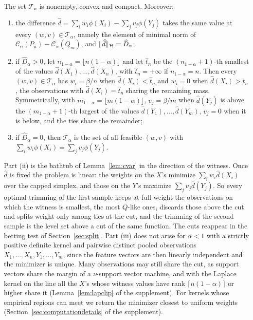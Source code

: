 \begin{proposition}
\label{prop:bangbang}
The set $\mathcal T_\alpha$ is nonempty, convex and compact. Moreover:
\begin{enumerate}[label=(\roman*),leftmargin=*]
\item the difference $\widehat d=\sum_iw_i\phi(X_i)-\sum_jv_j\phi(Y_j)$ takes the same value at every
$(w,v)\in\mathcal T_\alpha$, namely the element of minimal norm of $\mathcal C_\alpha(P_n)-\mathcal C_\alpha(Q_m)$, and
$\|\widehat d\|_{\mathcal{H}}=\widehat D_\alpha$;
\item if $\widehat D_\alpha>0$, let $n_{1-\alpha}=\lfloor n(1-\alpha)\rfloor$ and let $\widehat t_n$ be the
$(n_{1-\alpha}+1)$-th smallest of the values $\widehat d(X_1),\dots,\widehat d(X_n)$, with $\widehat t_n=+\infty$ if
$n_{1-\alpha}=n$. Then every $(w,v)\in\mathcal T_\alpha$ has $w_i=\beta/n$ when $\widehat d(X_i)<\widehat t_n$ and $w_i=0$
when $\widehat d(X_i)>\widehat t_n$, the observations with $\widehat d(X_i)=\widehat t_n$ sharing the remaining mass.
Symmetrically, with $m_{1-\alpha}=\lfloor m(1-\alpha)\rfloor$, $v_j=\beta/m$ when $\widehat d(Y_j)$ is above the
$(m_{1-\alpha}+1)$-th largest of the values $\widehat d(Y_1),\dots,\widehat d(Y_m)$, $v_j=0$ when it is below, and the ties
share the remainder;
\item if $\widehat D_\alpha=0$, then $\mathcal T_\alpha$ is the set of all feasible $(w,v)$ with
$\sum_iw_i\phi(X_i)=\sum_jv_j\phi(Y_j)$.
\end{enumerate}
\end{proposition}

Part (ii) is the bathtub of Lemma~\ref{lem:cvar} in the direction of the witness. Once $\widehat d$ is fixed the
problem is linear: the weights on the $X$'s minimize $\sum_iw_i\widehat d(X_i)$ over the capped simplex, and those on
the $Y$'s maximize $\sum_jv_j\widehat d(Y_j)$. So every optimal trimming of the first sample keeps at full weight the
observations on which the witness is smallest, the most $Q$-like ones, discards those above the cut and splits weight
only among ties at the cut, and the trimming of the second sample is the level set above a cut of the same function.
The cuts reappear in the betting test of Section~\ref{sec:split}. Part (iii) does not arise for $\alpha<1$ with a
strictly positive definite kernel and pairwise distinct pooled observations $X_1,\dots,X_n,Y_1,\dots,Y_m$, since the
feature vectors are then linearly independent and the minimizer is unique. Many observations may still share the cut,
as support vectors share the margin of a $\nu$-support vector machine, and with the Laplace kernel on the line all the
$X$'s whose witness values have rank $\lceil n(1-\alpha)\rceil$ or higher share it (Lemma~\ref{lem:lapclip} of the
supplement). For kernels whose empirical regions can meet we return the minimizer closest to uniform
weights (Section~\ref{sec:computationdetails} of the supplement).

